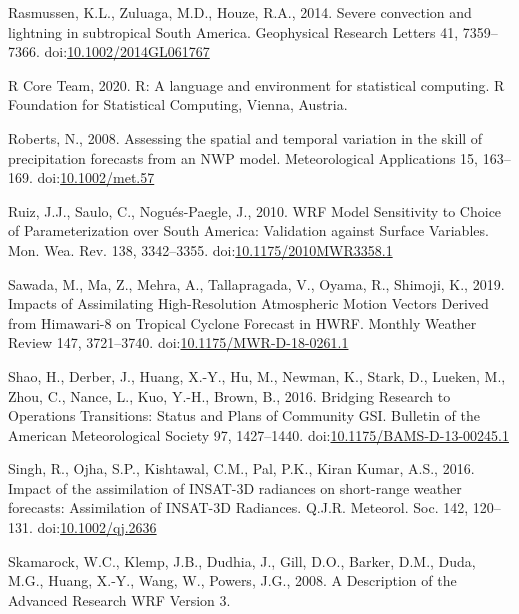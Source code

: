 \documentclass[final,5p,times,twocolumn,authoryear]{elsarticle} %
\begin{document}
\leavevmode\hypertarget{ref-rasmussen2014}{}%
Rasmussen, K.L., Zuluaga, M.D., Houze, R.A., 2014. Severe convection and lightning in subtropical South America. Geophysical Research Letters 41, 7359--7366. doi:\href{https://doi.org/10.1002/2014GL061767}{10.1002/2014GL061767}

\leavevmode\hypertarget{ref-rcoreteam2020}{}%
R Core Team, 2020. R: A language and environment for statistical computing. R Foundation for Statistical Computing, Vienna, Austria.

\leavevmode\hypertarget{ref-roberts2008}{}%
Roberts, N., 2008. Assessing the spatial and temporal variation in the skill of precipitation forecasts from an NWP model. Meteorological Applications 15, 163--169. doi:\href{https://doi.org/10.1002/met.57}{10.1002/met.57}

\leavevmode\hypertarget{ref-ruiz2010}{}%
Ruiz, J.J., Saulo, C., Nogués-Paegle, J., 2010. WRF Model Sensitivity to Choice of Parameterization over South America: Validation against Surface Variables. Mon. Wea. Rev. 138, 3342--3355. doi:\href{https://doi.org/10.1175/2010MWR3358.1}{10.1175/2010MWR3358.1}

\leavevmode\hypertarget{ref-sawada2019}{}%
Sawada, M., Ma, Z., Mehra, A., Tallapragada, V., Oyama, R., Shimoji, K., 2019. Impacts of Assimilating High-Resolution Atmospheric Motion Vectors Derived from Himawari-8 on Tropical Cyclone Forecast in HWRF. Monthly Weather Review 147, 3721--3740. doi:\href{https://doi.org/10.1175/MWR-D-18-0261.1}{10.1175/MWR-D-18-0261.1}

\leavevmode\hypertarget{ref-shao2016}{}%
Shao, H., Derber, J., Huang, X.-Y., Hu, M., Newman, K., Stark, D., Lueken, M., Zhou, C., Nance, L., Kuo, Y.-H., Brown, B., 2016. Bridging Research to Operations Transitions: Status and Plans of Community GSI. Bulletin of the American Meteorological Society 97, 1427--1440. doi:\href{https://doi.org/10.1175/BAMS-D-13-00245.1}{10.1175/BAMS-D-13-00245.1}

\leavevmode\hypertarget{ref-singh2016}{}%
Singh, R., Ojha, S.P., Kishtawal, C.M., Pal, P.K., Kiran Kumar, A.S., 2016. Impact of the assimilation of INSAT-3D radiances on short-range weather forecasts: Assimilation of INSAT-3D Radiances. Q.J.R. Meteorol. Soc. 142, 120--131. doi:\href{https://doi.org/10.1002/qj.2636}{10.1002/qj.2636}

\leavevmode\hypertarget{ref-skamarock2008}{}%
Skamarock, W.C., Klemp, J.B., Dudhia, J., Gill, D.O., Barker, D.M., Duda, M.G., Huang, X.-Y., Wang, W., Powers, J.G., 2008. A Description of the Advanced Research WRF Version 3.
\end{document}

